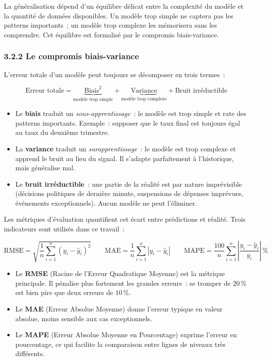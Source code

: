 La généralisation dépend d'un équilibre délicat entre la complexité du modèle et
la quantité de données disponibles. Un modèle trop simple ne captera pas les
patterns importants~; un modèle trop complexe les mémorisera sans les comprendre.
Cet équilibre est formalisé par le compromis biais-variance.

\subsubsection*{3.2.2 \quad Le compromis biais-variance}

L'erreur totale d'un modèle peut toujours se décomposer en trois termes~:

$$\text{Erreur totale} = \underbrace{\text{Biais}^2}_{\text{modèle trop simple}}
+ \underbrace{\text{Variance}}_{\text{modèle trop complexe}}
+ \text{Bruit irréductible}$$

\begin{itemize}
    \item Le \textbf{biais} traduit un \textit{sous-apprentissage}~: le modèle est
    trop simple et rate des patterns importants. Exemple~: supposer que le taux final
    est toujours égal au taux du deuxième trimestre.
    \item La \textbf{variance} traduit un \textit{surapprentissage}~: le modèle est
    trop complexe et apprend le bruit au lieu du signal. Il s'adapte parfaitement à
    l'historique, mais généralise mal.
    \item Le \textbf{bruit irréductible}~: une partie de la réalité est par nature
    imprévisible (décisions politiques de dernière minute, suspensions de dépenses
    imprévues, événements exceptionnels). Aucun modèle ne peut l'éliminer.
\end{itemize}

Les métriques d'évaluation quantifient cet écart entre prédictions et réalité.
Trois indicateurs sont utilisés dans ce travail~:

$$\text{RMSE} = \sqrt{\frac{1}{n}\sum_{i=1}^{n}(y_i - \hat{y}_i)^2} \qquad
\text{MAE} = \frac{1}{n}\sum_{i=1}^{n}|y_i - \hat{y}_i| \qquad
\text{MAPE} = \frac{100}{n}\sum_{i=1}^{n}\left|\frac{y_i - \hat{y}_i}{y_i}\right|\,\%$$

\begin{itemize}
    \item Le \textbf{RMSE} (Racine de l'Erreur Quadratique Moyenne) est la métrique
    principale. Il pénalise plus fortement les grandes erreurs~: se tromper de 20\,\%
    est bien pire que deux erreurs de 10\,\%.
    \item Le \textbf{MAE} (Erreur Absolue Moyenne) donne l'erreur typique en valeur
    absolue, moins sensible aux cas exceptionnels.
    \item Le \textbf{MAPE} (Erreur Absolue Moyenne en Pourcentage) exprime l'erreur
    en pourcentage, ce qui facilite la comparaison entre lignes de niveaux très
    différents.
\end{itemize}

